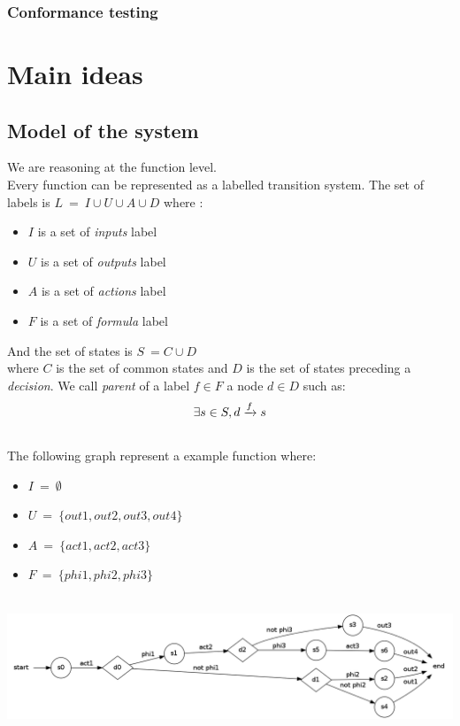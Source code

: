 \documentclass[a4paper]{report}
\begin{document}
\subsection*{Conformance testing}





\chapter*{Main ideas}

\section*{Model of the system}

We are reasoning at the function level.\\
Every function can be represented as a labelled transition system. The set of labels is $L\ =\ I \cup U \cup A \cup D$ where :\\
\begin{itemize}
\item $I$ is a set of \textit{inputs} label
\item $U$ is a set of \textit{outputs} label
\item $A$ is a set of \textit{actions} label
\item $F$ is a set of \textit{formula} label
\end{itemize}
And the set of states is $S\ = C \cup D$\\
where $C$ is the set of common states and $D$ is the set of states preceding a \textit{decision}.
We call \textit{parent} of a label $f \in F$ a node $d \in D$ such as:\\
\[
\exists s \in S, 
d \xrightarrow{f} s\\
\]
$ $\\
\newline
The following graph represent a example function where:
\begin{itemize}
\item $I\ =\ \emptyset$
\item $U\ =\ \{out1, out2, out3, out4\}$
\item $A\ =\ \{act1, act2, act3\}$
\item $F\ =\ \{phi1, phi2, phi3\}$
\end{itemize}
$ $\\
\includegraphics[scale=0.3]{../graphviz/LTSExample.png}
$ $\\
\newline
\end{document}
